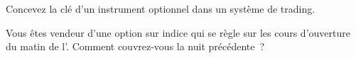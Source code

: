 \begin{interviewq}\label{iq:m1:option-contracts-and-exchanges:5}
Concevez la clé d'un instrument optionnel dans un système de trading.
\end{interviewq}

\begin{interviewq}\label{iq:m1:option-contracts-and-exchanges:6}
Vous êtes vendeur d'une option sur indice qui se règle sur les cours d'ouverture
du matin de l'. Comment couvrez-vous la nuit précédente~?
\end{interviewq}
